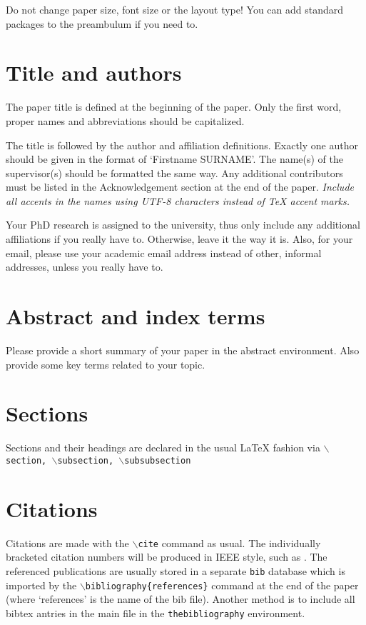 \documentclass[10pt, conference,a4paper]{ITKproc}
\begin{document}
Do not change paper size, font size or the layout type! You can add standard packages to the preambulum if you need to.


\section{Title and authors}
The paper title is defined at the beginning of the paper. Only the first word, proper names and abbreviations should be capitalized.

The title is followed by the author and affiliation definitions. Exactly one author should be given in the format of `Firstname SURNAME'. The name(s) of the supervisor(s) should be formatted the same way. Any additional contributors must be listed in the Acknowledgement section at the end of the paper. \textit{Include all accents in the names using UTF-8 characters instead of TeX accent marks.}

Your PhD research is assigned to the university, thus only include any additional affiliations if you really have to. Otherwise, leave it the way it is. Also, for your email, please use your academic email address instead of other, informal addresses, unless you really have to. 

\section{Abstract and index terms}
Please provide a short summary of your paper in the abstract environment. Also provide some key terms related to your topic.

\section{Sections}
Sections and their headings are declared in the usual {\LaTeX}
fashion via \texttt{$\backslash$section, $\backslash$subsection, $\backslash$subsubsection}



\section{Citations}
Citations are made with the  \texttt{$\backslash$cite} command as usual.
The individually bracketed citation numbers will be produced in IEEE style, such as \cite{lamport94}. The referenced publications are usually stored in a separate \texttt{bib} database which is imported by the \texttt{$\backslash$bibliography\{references\}} command at the end of the paper (where `references' is the name of the bib file). Another method is to include all bibtex antries in the main file in the \texttt{thebibliography} environment.
\end{document}
